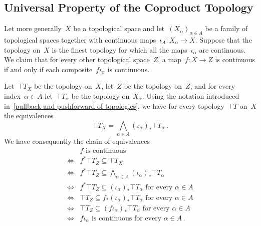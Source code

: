 \subsection{Universal Property of the Coproduct Topology}

Let more generally~$X$ be a topological space and let~$(X_α)_{α ∈ A}$ be a family of topological spaces together with continuous maps~$ι_A \colon X_α \to X$.
Suppose that the topology on~$X$ is the finest topology for which all the maps~$ι_α$ are continuous.
We claim that for every other topological space~$Z$, a map~$f \colon X \to Z$ is continuous if and only if each composite~$f ι_α$ is continuous.

Let~$\top{T}_X$ be the topology on~$X$, let~$Z$ be the topology on~$Z$, and for every index~$α ∈ A$ let~$\top{T}_α$ be the topology on~$X_α$.
Using the notation introduced in~\cref{pullback and pushforward of topologies}, we have for every topology~$\top{T}$ on~$X$ the equivalences
\[
	\top{T}_X = ⋀_{α ∈ A} (ι_α)_* \top{T}_α \,.
\]
We have consequently the chain of equivalences
\begin{align*}
	{}&
	\text{$f$ is continuous} \\
	\iff{}&
	f^* \top{T}_Z ⊆ \top{T}_X \\
	\iff{}&
	\textstyle f^* \top{T}_Z ⊆ ⋀_{α ∈ A} (ι_α)_* \top{T}_α \\
	\iff{}&
	\text{$f^* \top{T}_Z ⊆ (ι_α)_* \top{T}_α$ for every~$α ∈ A$} \\
	\iff{}&
	\text{$\top{T}_Z ⊆ f_* (ι_α)_* \top{T}_α$ for every~$α ∈ A$} \\
	\iff{}&
	\text{$\top{T}_Z ⊆ (f ι_α)_* \top{T}_α$ for every~$α ∈ A$} \\
	\iff{}&
	\text{$f ι_α$ is continuous for every~$α ∈ A$} \,.
\end{align*}
